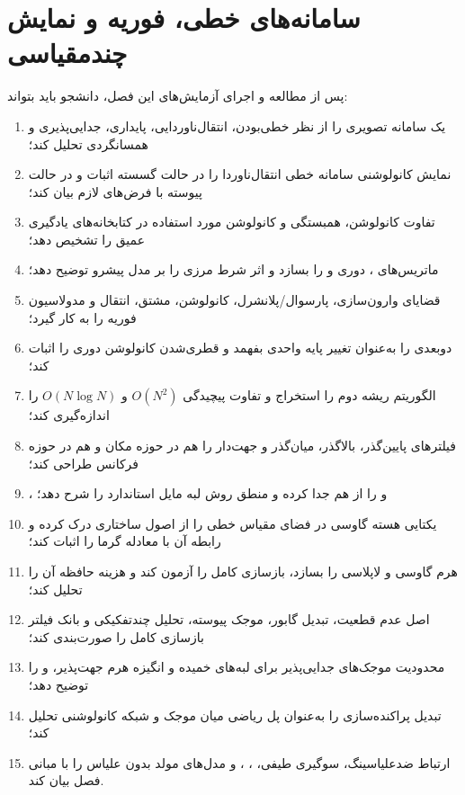 \chapter{سامانه‌های خطی، فوریه و نمایش چندمقیاسی}
\label{chap:lti-fourier-multiscale}

\begin{learningbox}
پس از مطالعه و اجرای آزمایش‌های این فصل، دانشجو باید بتواند:
\begin{enumerate}
\item یک سامانه تصویری را از نظر خطی‌بودن، انتقال‌ناوردایی، پایداری، جدایی‌پذیری و همسانگردی تحلیل کند؛
\item نمایش کانولوشنی سامانه خطی انتقال‌ناوردا را در حالت گسسته اثبات و در حالت پیوسته با فرض‌های لازم بیان کند؛
\item تفاوت کانولوشن، همبستگی و کانولوشن مورد استفاده در کتابخانه‌های یادگیری عمیق را تشخیص دهد؛
\item ماتریس‌های ، دوری و  را بسازد و اثر شرط مرزی را بر مدل پیشرو توضیح دهد؛
\item قضایای وارون‌سازی، پارسوال/پلانشرل، کانولوشن، مشتق، انتقال و مدولاسیون فوریه را به کار گیرد؛
\item {} دوبعدی را به‌عنوان تغییر پایه واحدی بفهمد و قطری‌شدن کانولوشن دوری را اثبات کند؛
\item الگوریتم  ریشه دوم را استخراج و تفاوت پیچیدگی \(O(N^2)\) و \(O(N\log N)\) را اندازه‌گیری کند؛
\item فیلترهای پایین‌گذر، بالاگذر، میان‌گذر و جهت‌دار را هم در حوزه مکان و هم در حوزه فرکانس طراحی کند؛
\item {}،  و  را از هم جدا کرده و منطق روش لبه مایل استاندارد  را شرح دهد؛
\item یکتایی هسته گاوسی در فضای مقیاس خطی را از اصول ساختاری درک کرده و رابطه آن با معادله گرما را اثبات کند؛
\item هرم گاوسی و لاپلاسی را بسازد، بازسازی کامل را آزمون کند و هزینه حافظه آن را تحلیل کند؛
\item اصل عدم قطعیت، تبدیل گابور، موجک پیوسته، تحلیل چندتفکیکی و بانک فیلتر بازسازی کامل را صورت‌بندی کند؛
\item محدودیت موجک‌های جدایی‌پذیر برای لبه‌های خمیده و انگیزه هرم جهت‌پذیر،  و  را توضیح دهد؛
\item تبدیل پراکنده‌سازی را به‌عنوان پل ریاضی میان موجک و شبکه کانولوشنی تحلیل کند؛
\item ارتباط ضدعلیاسینگ، سوگیری طیفی، ، ،  و مدل‌های مولد بدون علیاس را با مبانی فصل بیان کند.
\end{enumerate}
\end{learningbox}

